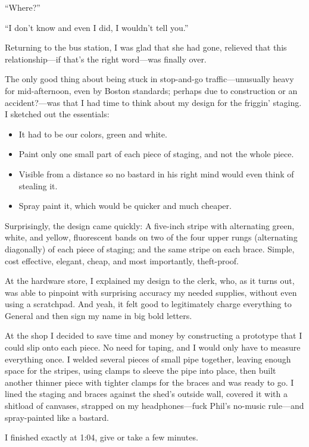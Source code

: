 ``Where?''

``I don't know and even I did, I wouldn't tell you.''

Returning to the bus station, I was glad that she had gone, relieved
that this relationship---if that's the right word---was finally over.

The only good thing about being stuck in stop-and-go traffic---unusually
heavy for mid-afternoon, even by Boston standards; perhaps due to
construction or an accident?---was that I had time to think about my
design for the friggin' staging. I sketched out the essentials:

\begin{itemize}
\tightlist
\item
  It had to be our colors, green and white.
\item
  Paint only one small part of each piece of staging, and not the whole
  piece.
\item
  Visible from a distance so no bastard in his right mind would even
  think of stealing it.
\item
  Spray paint it, which would be quicker and much cheaper.
\end{itemize}

Surprisingly, the design came quickly: A five-inch stripe with
alternating green, white, and yellow, fluorescent bands on two of the
four upper rungs (alternating diagonally) of each piece of staging; and
the same stripe on each brace. Simple, cost effective, elegant, cheap,
and most importantly, theft-proof.

At the hardware store, I explained my design to the clerk, who, as it
turns out, was able to pinpoint with surprising accuracy my needed
supplies, without even using a scratchpad. And yeah, it felt good to
legitimately charge everything to General and then sign my name in big
bold letters.

At the shop I decided to save time and money by constructing a prototype
that I could slip onto each piece. No need for taping, and I would only
have to measure everything once. I welded several pieces of small pipe
together, leaving enough space for the stripes, using clamps to sleeve
the pipe into place, then built another thinner piece with tighter
clamps for the braces and was ready to go. I lined the staging and
braces against the shed's outside wall, covered it with a shitload of
canvases, strapped on my headphones---fuck Phil's no-music rule---and
spray-painted like a bastard.

I finished exactly at 1:04, give or take a few minutes.


